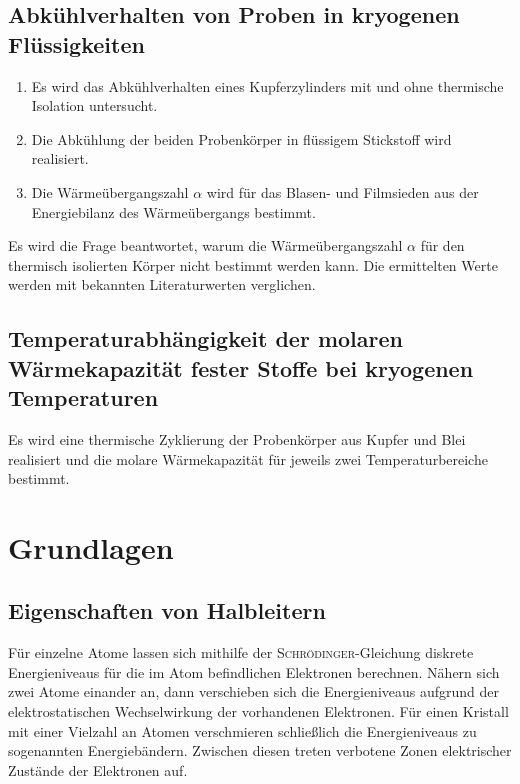 \documentclass[parskip=half, a4paper,twoside,final]{article}
\begin{document}
\subsection{Abkühlverhalten von Proben in kryogenen Flüssigkeiten}
\begin{enumerate}
  \item Es wird das Abkühlverhalten eines Kupferzylinders mit und ohne thermische Isolation untersucht.
  \item Die Abkühlung der beiden Probenkörper in flüssigem Stickstoff wird realisiert.
  \item Die Wärmeübergangszahl $\alpha$ wird für das Blasen- und Filmsieden aus der Energiebilanz des Wärmeübergangs bestimmt.
\end{enumerate}
Es wird die Frage beantwortet, warum die Wärmeübergangszahl $\alpha$ für den thermisch isolierten Körper nicht bestimmt werden kann. Die ermittelten Werte werden mit bekannten Literaturwerten verglichen.

\subsection{Temperaturabhängigkeit der molaren Wärmekapazität fester Stoffe bei kryogenen Temperaturen}

Es wird eine thermische Zyklierung der Probenkörper aus Kupfer und Blei realisiert und die molare Wärmekapazität für jeweils zwei Temperaturbereiche bestimmt.



\newpage
\section{Grundlagen} \label{sec:Grundlagen}

\subsection{Eigenschaften von Halbleitern}
Für einzelne Atome lassen sich mithilfe der \textsc{Schrödinger}-Gleichung diskrete Energieniveaus für die im Atom befindlichen Elektronen berechnen. Nähern sich zwei Atome einander an, dann verschieben sich die Energieniveaus aufgrund der elektrostatischen Wechselwirkung der vorhandenen Elektronen. Für einen Kristall mit einer Vielzahl an Atomen verschmieren schließlich die Energieniveaus zu sogenannten Energiebändern. Zwischen diesen treten verbotene Zonen elektrischer Zustände der Elektronen auf.
\end{document}
